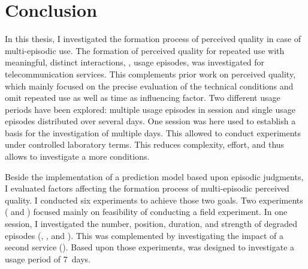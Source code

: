 \chapter{Conclusion}\label{chap:discussion}
In this thesis, I investigated the formation process of perceived quality in case of multi-episodic use.
The formation of perceived quality for repeated use with meaningful, distinct interactions, \ie, usage episodes, was investigated for telecommunication services.
This complements prior work on perceived quality, which mainly focused on the precise evaluation of the technical conditions and omit repeated use as well as time as influencing factor.
Two different usage periods have been explored: multiple usage episodes in session and single usage episodes distributed over several days.
One session was here used to establish a basis for the investigation of multiple days.
This allowed to conduct experiments under controlled laboratory terms.
This reduces complexity, effort, and thus allows to investigate a more conditions.

Beside the implementation of a prediction model based upon episodic judgments, I evaluated factors affecting the formation process of multi-episodic perceived quality.
I conducted six experiments to achieve those two goals.
Two experiments ( and ) focused mainly on feasibility of conducting a field experiment.
In one session, I investigated the number, position, duration, and strength of degraded episodes (, \EIIa{}, and ).
This was complemented by investigating the impact of a second service (\EIIb{}).
Based upon those experiments,  was designed to investigate a usage period of 7~days.

